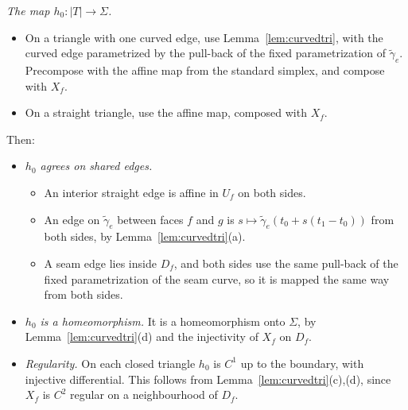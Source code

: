 \documentclass[preprint,12pt]{elsarticle}
\theoremstyle{definition}
\theoremstyle{remark}
\begin{document}
\emph{The map $h_0\colon|T|\to\Sigma$.}
\begin{itemize}
\item On a triangle with one curved edge, use Lemma~\ref{lem:curvedtri}, with the curved edge parametrized by the
pull-back of the fixed parametrization of $\tilde\gamma_e$. Precompose with the affine map from the standard simplex,
and compose with $X_f$.
\item On a straight triangle, use the affine map, composed with $X_f$.
\end{itemize}
Then:
\begin{itemize}
\item \emph{$h_0$ agrees on shared edges.}
  \begin{itemize}
  \item An interior straight edge is affine in $U_f$ on both sides.
  \item An edge on $\tilde\gamma_e$ between faces $f$ and $g$ is $s\mapsto\tilde\gamma_e(t_0+s(t_1-t_0))$ from both
  sides, by Lemma~\ref{lem:curvedtri}(a).
  \item A seam edge lies inside $D_f$, and both sides use the same pull-back of the fixed parametrization of the
  seam curve, so it is mapped the same way from both sides.
  \end{itemize}
\item \emph{$h_0$ is a homeomorphism.} It is a homeomorphism onto $\Sigma$, by Lemma~\ref{lem:curvedtri}(d) and the
injectivity of $X_f$ on $D_f$.
\item \emph{Regularity.} On each closed triangle $h_0$ is $C^1$ up to the boundary, with injective differential. This
follows from Lemma~\ref{lem:curvedtri}(c),(d), since $X_f$ is $C^2$ regular on a neighbourhood of $D_f$.
\end{itemize}
\end{document}
